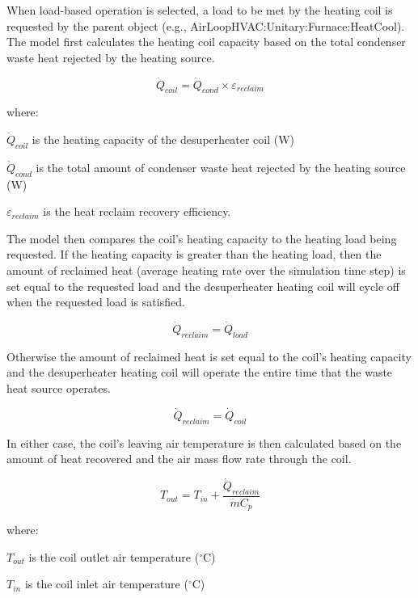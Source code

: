 When load-based operation is selected, a load to be met by the heating coil is requested by the parent object (e.g., AirLoopHVAC:Unitary:Furnace:HeatCool). The model first calculates the heating coil capacity based on the total condenser waste heat rejected by the heating source.

\begin{equation}
{\dot Q_{coil}} = {\dot Q_{cond}} \times {\varepsilon_{reclaim}}
\end{equation}

where:

\({\dot Q_{coil}}\) is the heating capacity of the desuperheater coil (W)

\({\dot Q_{cond}}\) is the total amount of condenser waste heat rejected by the heating source (W)

\({\varepsilon_{reclaim}}\) is the heat reclaim recovery efficiency.

The model then compares the coil's heating capacity to the heating load being requested. If the heating capacity is greater than the heating load, then the amount of reclaimed heat (average heating rate over the simulation time step) is set equal to the requested load and the desuperheater heating coil will cycle off when the requested load is satisfied.

\begin{equation}
{\dot Q_{reclaim}} = {\dot Q_{load}}
\end{equation}

Otherwise the amount of reclaimed heat is set equal to the coil's heating capacity and the desuperheater heating coil will operate the entire time that the waste heat source operates.

\begin{equation}
{\dot Q_{reclaim}} = {\dot Q_{coil}}
\end{equation}

In either case, the coil's leaving air temperature is then calculated based on the amount of heat recovered and the air mass flow rate through the coil.

\begin{equation}
{T_{out}} = {T_{in}} + \frac{{{{\dot Q}_{reclaim}}}}{{\dot m{C_p}}}
\end{equation}

where:

\({T_{out}}\) is the coil outlet air temperature (\(^{\circ}\)C)

\({T_{in}}\) is the coil inlet air temperature (\(^{\circ}\)C)

